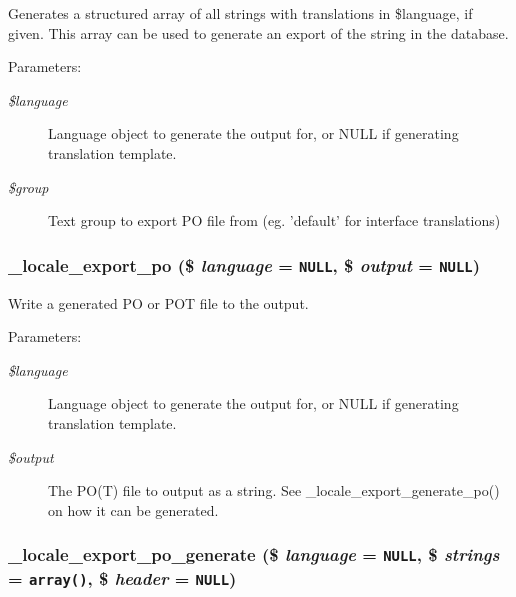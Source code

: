 Generates a structured array of all strings with translations in \$language, if given. This array can be used to generate an export of the string in the database.

\begin{Desc}
\item[Parameters:]
\begin{description}
\item[{\em \$language}]Language object to generate the output for, or NULL if generating translation template. \item[{\em \$group}]Text group to export PO file from (eg. 'default' for interface translations) \end{description}
\end{Desc}
\hypertarget{group__locale_gc152719d6aeadee6074247100424e145}{
\subsubsection[{\_\-locale\_\-export\_\-po}]{\setlength{\rightskip}{0pt plus 5cm}\_\-locale\_\-export\_\-po (\$ {\em language} = {\tt NULL}, \/  \$ {\em output} = {\tt NULL})}}
\label{group__locale_gc152719d6aeadee6074247100424e145}


Write a generated PO or POT file to the output.

\begin{Desc}
\item[Parameters:]
\begin{description}
\item[{\em \$language}]Language object to generate the output for, or NULL if generating translation template. \item[{\em \$output}]The PO(T) file to output as a string. See \_\-locale\_\-export\_\-generate\_\-po() on how it can be generated. \end{description}
\end{Desc}
\hypertarget{group__locale_g694b7e78936d2875e18ef4c8171b7eb8}{
\subsubsection[{\_\-locale\_\-export\_\-po\_\-generate}]{\setlength{\rightskip}{0pt plus 5cm}\_\-locale\_\-export\_\-po\_\-generate (\$ {\em language} = {\tt NULL}, \/  \$ {\em strings} = {\tt array()}, \/  \$ {\em header} = {\tt NULL})}}
\label{group__locale_g694b7e78936d2875e18ef4c8171b7eb8}


